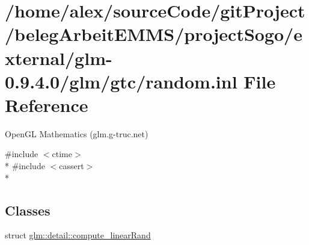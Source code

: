 \hypertarget{random_8inl}{\section{/home/alex/source\-Code/git\-Project/beleg\-Arbeit\-E\-M\-M\-S/project\-Sogo/external/glm-\/0.9.4.0/glm/gtc/random.inl File Reference}
\label{random_8inl}
}


Open\-G\-L Mathematics (glm.\-g-\/truc.\-net)  


{\ttfamily \#include $<$ctime$>$}\\*
{\ttfamily \#include $<$cassert$>$}\\*
\subsection*{Classes}
\begin{DoxyCompactItemize}
\item 
struct \hyperlink{structglm_1_1detail_1_1compute__linearRand}{glm\-::detail\-::compute\-\_\-linear\-Rand}
\end{DoxyCompactItemize}
